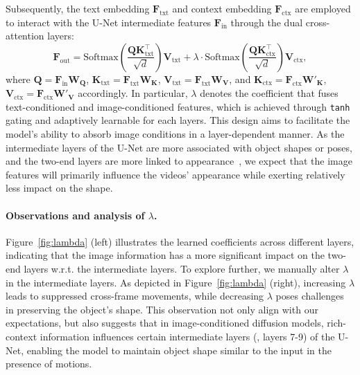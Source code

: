 Subsequently, the text embedding $\mathbf{F}_{\text{txt}}$ and context embedding $\mathbf{F}_{\text{ctx}}$ are employed to interact with the U-Net intermediate features $\mathbf{F}_{\text{in}}$ through the dual cross-attention layers:
\begin{equation}
\mathbf{F}_{\text{out}} = \text{Softmax}(\frac{\mathbf{Q} \mathbf{K}_{\text{txt}}^{\top}}{\sqrt{d}})\mathbf{V}_{\text{txt}} + \lambda \cdot \text{Softmax}(\frac{\mathbf{Q} \mathbf{K}_{\text{ctx}}^{\top}}{\sqrt{d}})\mathbf{V}_{\text{ctx}},
\end{equation}
where $\mathbf{Q}=\mathbf{F}_{\text{in}}\mathbf{W}_\mathbf{Q}$, $\mathbf{K}_{\text{txt}}=\mathbf{F}_{\text{txt}}\mathbf{W}_\mathbf{K}$, $\mathbf{V}_{\text{txt}}=\mathbf{F}_{\text{txt}}\mathbf{W}_\mathbf{V}$, and $\mathbf{K}_{\text{ctx}}=\mathbf{F}_{\text{ctx}}\mathbf{W}'_\mathbf{K}$, $\mathbf{V}_{\text{ctx}}=\mathbf{F}_{\text{ctx}}\mathbf{W}'_\mathbf{V}$ accordingly.
In particular, $\lambda$ denotes the coefficient that fuses text-conditioned and image-conditioned features, which is achieved through \texttt{tanh} gating and adaptively learnable for each layers. This design aims to facilitate the model's ability to absorb image conditions in a layer-dependent manner. As the intermediate layers of the U-Net are more associated with object shapes or poses, and the two-end layers are more linked to appearance~\cite{voynov2023p}, we expect that the image features will primarily influence the videos' appearance while exerting relatively less impact on the shape.



\vspace{-4mm}
\paragraph{Observations and analysis of $\lambda$.} Figure~\ref{fig:lambda} (left) illustrates the learned coefficients across different layers, indicating that the image information has a more significant impact on the two-end layers w.r.t. the intermediate layers. To explore further, we manually alter $\lambda$ in the intermediate layers. As depicted in Figure~\ref{fig:lambda} (right), increasing $\lambda$ leads to suppressed cross-frame movements, while decreasing $\lambda$ poses challenges in preserving the object's shape. This observation not only align with our expectations, but also suggests that in image-conditioned diffusion models, rich-context information influences certain intermediate layers (\eg, layers 7-9) of the U-Net, enabling the model to maintain object shape similar to the input in the presence of motions.

